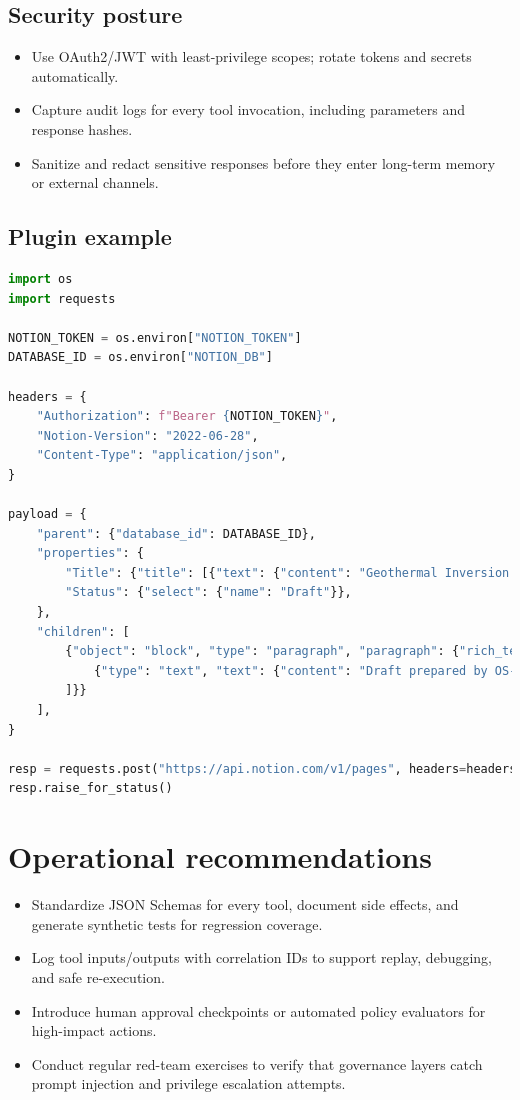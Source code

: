 \documentclass{article}
\begin{document}
\subsection{Security posture}
\begin{itemize}
  \item Use OAuth2/JWT with least-privilege scopes; rotate tokens and secrets automatically.
  \item Capture audit logs for every tool invocation, including parameters and response hashes.
  \item Sanitize and redact sensitive responses before they enter long-term memory or external channels.
\end{itemize}

\subsection{Plugin example}
\begin{lstlisting}[language=Python,caption={Writing a research note to Notion through the public API}]
import os
import requests

NOTION_TOKEN = os.environ["NOTION_TOKEN"]
DATABASE_ID = os.environ["NOTION_DB"]

headers = {
    "Authorization": f"Bearer {NOTION_TOKEN}",
    "Notion-Version": "2022-06-28",
    "Content-Type": "application/json",
}

payload = {
    "parent": {"database_id": DATABASE_ID},
    "properties": {
        "Title": {"title": [{"text": {"content": "Geothermal Inversion Summary"}}]},
        "Status": {"select": {"name": "Draft"}},
    },
    "children": [
        {"object": "block", "type": "paragraph", "paragraph": {"rich_text": [
            {"type": "text", "text": {"content": "Draft prepared by OS-Agent after log analysis."}}
        ]}}
    ],
}

resp = requests.post("https://api.notion.com/v1/pages", headers=headers, json=payload, timeout=15)
resp.raise_for_status()
\end{lstlisting}

\section*{Operational recommendations}
\begin{itemize}
  \item Standardize JSON Schemas for every tool, document side effects, and generate synthetic tests for regression coverage.
  \item Log tool inputs/outputs with correlation IDs to support replay, debugging, and safe re-execution.
  \item Introduce human approval checkpoints or automated policy evaluators for high-impact actions.
  \item Conduct regular red-team exercises to verify that governance layers catch prompt injection and privilege escalation attempts.
\end{itemize}
\end{document}
